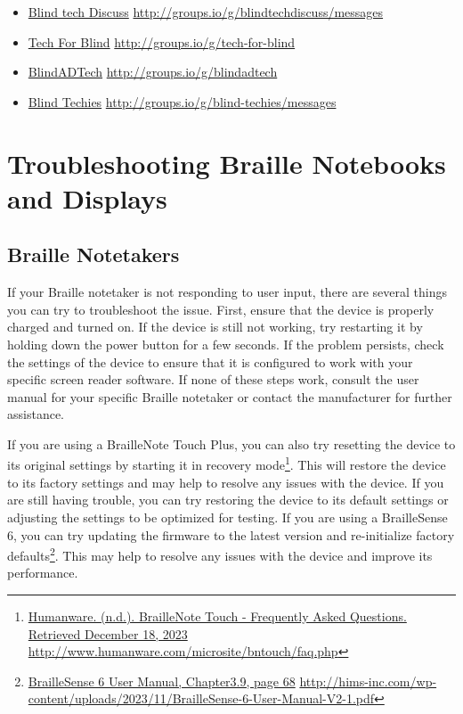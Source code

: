 \documentclass[12pt,letterpaper,twoside,openright]{report}
\begin{document}
\begin{appendices}
\begin{itemize}[leftmargin=*]
\begin{itemize}[leftmargin=2em]
\item \href{http://groups.io/g/blindtechdiscuss/messages}{Blind tech Discuss}  \break\url{http://groups.io/g/blindtechdiscuss/messages}
\item \href{http://groups.io/g/tech-for-blind}{Tech For Blind}  \break\url{http://groups.io/g/tech-for-blind}
\item \href{http://groups.io/g/blindadtech}{BlindADTech}  \break\url{http://groups.io/g/blindadtech}
\item \href{http://groups.io/g/blind-techies/messages}{Blind Techies}  \break\url{http://groups.io/g/blind-techies/messages}
\end{itemize}
\end{itemize}

\cleardoublepage\hypertarget{trouble2}{}\chapter[\raggedright Troubleshooting Braille Notebooks and Displays\hfill\break ]{Troubleshooting Braille Notebooks and Displays}\label{trouble2}
\minitoc \newpage
\hypertarget{notebook2}{}\section{Braille Notetakers}\label{notebook}
If your Braille notetaker is not responding to user input, there are several things you can try to troubleshoot the issue. First, ensure that the device is properly charged and turned on. If the device is still not working, try restarting it by holding down the power button for a few seconds. If the problem persists, check the settings of the device to ensure that it is configured to work with your specific screen reader software. If none of these steps work, consult the user manual for your specific Braille notetaker or contact the manufacturer for further assistance.

If you are using a BrailleNote Touch Plus, you can also try resetting the device to its original settings by starting it in recovery mode\footnote{\raggedright \href{http://www.humanware.com/microsite/bntouch/faq.php}{Humanware. (n.d.). BrailleNote Touch - Frequently Asked Questions. Retrieved December 18, 2023} \url{http://www.humanware.com/microsite/bntouch/faq.php}}. This will restore the device to its factory settings and may help to resolve any issues with the device. If you are still having trouble, you can try restoring the device to its default settings or adjusting the settings to be optimized for testing. If you are using a BrailleSense 6, you can try updating the firmware to the latest version and re-initialize factory defaults\footnote{\raggedright \href{http://hims-inc.com/wp-content/uploads/2023/11/BrailleSense-6-User-Manual-V2-1.pdf}{BrailleSense 6 User Manual, Chapter3.9, page 68} \url{http://hims-inc.com/wp-content/uploads/2023/11/BrailleSense-6-User-Manual-V2-1.pdf}}. This may help to resolve any issues with the device and improve its performance.


\end{appendices}
\end{document}
